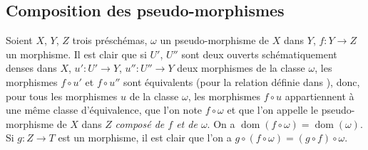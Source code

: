 \subsection{Composition des pseudo-morphismes}

\begin{env}[20.3.1]
Soient $X$, $Y$, $Z$ trois préschémas, $\omega$ un pseudo-morphisme de $X$ dans $Y$, $f:Y\to Z$ un morphisme.
Il est clair que si $U'$, $U''$ sont deux ouverts schématiquement denses dans $X$, $u':U'\to Y$, $u'':U''\to Y$ deux morphismes de la classe $\omega$, les morphismes $f\circ u'$ et $f\circ u''$ sont équivalents (pour la relation définie dans ), donc, pour tous les morphismes $u$ de la classe $\omega$, les morphismes $f\circ u$ appartiennent à une même classe d'équivalence, que l'on note $f\circ\omega$ et que l'on appelle le pseudo-morphisme de $X$ dans $Z$ \emph{composé de $f$ et de $\omega$}.
On a $\operatorname{dom}(f\circ\omega)=\operatorname{dom}(\omega)$.
Si $g:Z\to T$ est un morphisme, il est clair que l'on a $g\circ(f\circ\omega)=(g\circ f)\circ\omega$.
\end{env}

